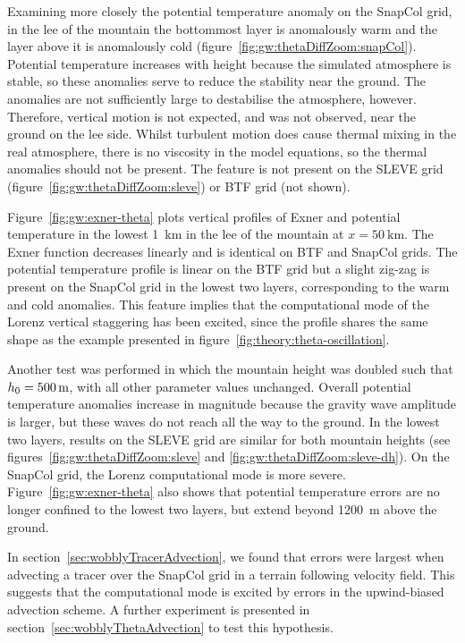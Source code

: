 Examining more closely the potential temperature anomaly on the SnapCol grid, in the lee of the mountain the bottommost layer is anomalously warm and the layer above it is anomalously cold (figure~\ref{fig:gw:thetaDiffZoom:snapCol}).  Potential temperature increases with height because the simulated atmosphere is stable, so these anomalies serve to reduce the stability near the ground.  The anomalies are not sufficiently large to destabilise the atmosphere, however.   Therefore, vertical motion is not expected, and was not observed, near the ground on the lee side.   Whilst turbulent motion does cause thermal mixing in the real atmosphere, there is no viscosity in the model equations, so the thermal anomalies should not be present.  The feature is not present on the SLEVE grid (figure~\ref{fig:gw:thetaDiffZoom:sleve}) or BTF grid (not shown).

Figure~\ref{fig:gw:exner-theta} plots vertical profiles of Exner and potential temperature in the lowest \SI{1}{\kilo\meter} in the lee of the mountain at $x = \SI{50}{\kilo\meter}$.  The Exner function decreases linearly and is identical on BTF and SnapCol grids.  The potential temperature profile is linear on the BTF grid but a slight zig-zag is present on the SnapCol grid in the lowest two layers, corresponding to the warm and cold anomalies.  
This feature implies that the computational mode of the Lorenz vertical staggering has been excited, since the profile shares the same shape as the example presented in figure~\ref{fig:theory:theta-oscillation}.

Another test was performed in which the mountain height was doubled such that $h_0 = \SI{500}{\meter}$, with all other parameter values unchanged.  Overall potential temperature anomalies increase in magnitude because the gravity wave amplitude is larger, but these waves do not reach all the way to the ground.  In the lowest two layers, results on the SLEVE grid are similar for both mountain heights (see figures~\ref{fig:gw:thetaDiffZoom:sleve} and \ref{fig:gw:thetaDiffZoom:sleve-dh}).  On the SnapCol grid, the Lorenz computational mode is more severe.  Figure~\ref{fig:gw:exner-theta} also shows that potential temperature errors are no longer confined to the lowest two layers, but extend beyond \SI{1200}{\meter} above the ground.

In section~\ref{sec:wobblyTracerAdvection}, we found that errors were largest when advecting a tracer over the SnapCol grid in a terrain following velocity field.  This suggests that the computational mode is excited by errors in the upwind-biased advection scheme.  A further experiment is presented in section~\ref{sec:wobblyThetaAdvection} to test this hypothesis.

